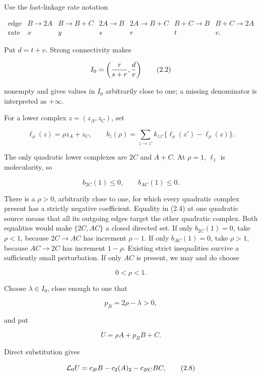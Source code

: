 Use the fast-linkage rate notation

\[
\begin{array}{c|cccccc}
\text{edge}&B\to2A&B\to B+C&2A\to B&2A\to B+C&B+C\to B&B+C\to2A\\
\hline
\text{rate}&x&y&s&r&t&v .
\end{array}                                                \tag{2.1}
\]

Put \(d=t+v\). Strong connectivity makes

\[
 I_0=\left({r\over s+r},{d\over v}\right)                 \tag{2.2}
\]

nonempty and gives values in \(I_0\) arbitrarily close to one; a missing
denominator is interpreted as \(+\infty\).

For a lower complex \(z=(z_A,z_C)\), set

\[
 \ell_\rho(z)=\rho z_A+z_C,\qquad
 b_z(\rho)=\sum_{z\to z'}k_{zz'}
       \{\ell_\rho(z')-\ell_\rho(z)\}.                    \tag{2.3}
\]

The only quadratic lower complexes are \(2C\) and \(A+C\). At
\(\rho=1\), \(\ell_1\) is molecularity, so

\[
 b_{2C}(1)\le0,\qquad b_{AC}(1)\le0.                     \tag{2.4}
\]

There is a \(\rho>0\), arbitrarily close to one, for which every
quadratic complex present has a strictly negative coefficient. Equality
in (2.4) at one quadratic source means that all its outgoing edges
target the other quadratic complex. Both equalities would make
\(\{2C,AC\}\) a closed directed set. If only \(b_{2C}(1)=0\), take
\(\rho<1\), because \(2C\to AC\) has increment \(\rho-1\). If only
\(b_{AC}(1)=0\), take \(\rho>1\), because \(AC\to2C\) has increment
\(1-\rho\). Existing strict inequalities survive a sufficiently small
perturbation. If only \(AC\) is present, we may and do choose

\[
 0<\rho<1.                                                \tag{2.5}
\]

Choose \(\lambda\in I_0\), close enough to one that

\[
 p_B=2\rho-\lambda>0,                                    \tag{2.6}
\]

and put

\[
 U=\rho A+p_BB+C.                                        \tag{2.7}
\]

Direct substitution gives

\[
 {\cal L}_0U=c_BB-c_2(A)_2-c_{BC}BC,                     \tag{2.8}
\]

